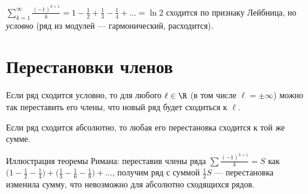 \begin{example}
$\displaystyle\sum_{k=1}^\infty\frac{(-1)^{k+1}}{k}=1-\frac12+\frac13-\frac14+\dots=\ln2$ сходится
по признаку Лейбница, но \emph{условно} (ряд из модулей — гармонический, расходится).
\end{example}

\section{Перестановки членов}

\begin{theorem}[Риман]
Если ряд сходится условно, то для любого $\ell\in\R$ (в том числе $\ell=\pm\infty$) можно так
переставить его члены, что новый ряд будет сходиться к $\ell$.
\end{theorem}

\begin{theorem}[Дирихле]
Если ряд сходится абсолютно, то любая его перестановка сходится к той же сумме.
\end{theorem}

\begin{remark}
Иллюстрация теоремы Римана: переставив члены ряда
$\sum\frac{(-1)^{k+1}}{k}=S$ как
$\bigl(1-\tfrac12-\tfrac14\bigr)+\bigl(\tfrac13-\tfrac16-\tfrac18\bigr)+\dots$, получим ряд с
суммой $\tfrac12 S$ — перестановка изменила сумму, что невозможно для абсолютно сходящихся рядов.
\end{remark}
